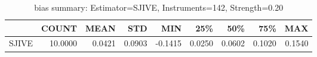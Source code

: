 \begin{table}[ht]
\centering
\caption{bias summary: Estimator=SJIVE, Instruments=142, Strength=0.20}
\begin{tabular}{lrrrrrrrr}
\toprule
 & COUNT & MEAN & STD & MIN & 25\% & 50\% & 75\% & MAX \\
\midrule
SJIVE & 10.0000 & 0.0421 & 0.0903 & -0.1415 & 0.0250 & 0.0602 & 0.1020 & 0.1540 \\
\bottomrule
\end{tabular}
\end{table}
